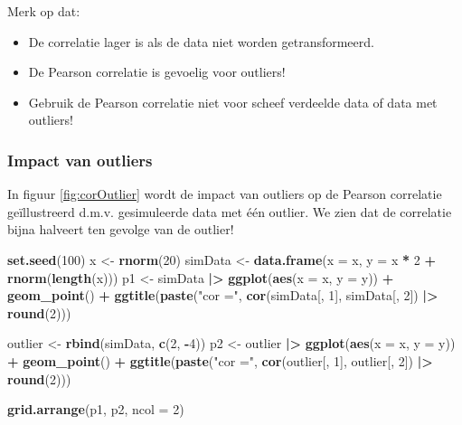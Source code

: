 \documentclass[
  12pt,dutch]{book}
\newenvironment{Shaded}{\begin{snugshade}}{\end{snugshade}}
\newcommand{\AttributeTok}[1]{\textcolor[rgb]{0.13,0.29,0.53}{#1}}
\newcommand{\DecValTok}[1]{\textcolor[rgb]{0.00,0.00,0.81}{#1}}
\newcommand{\FunctionTok}[1]{\textcolor[rgb]{0.13,0.29,0.53}{\textbf{#1}}}
\newcommand{\NormalTok}[1]{#1}
\newcommand{\OtherTok}[1]{\textcolor[rgb]{0.56,0.35,0.01}{#1}}
\newcommand{\SpecialCharTok}[1]{\textcolor[rgb]{0.81,0.36,0.00}{\textbf{#1}}}
\newcommand{\StringTok}[1]{\textcolor[rgb]{0.31,0.60,0.02}{#1}}
\providecommand{\tightlist}{%
  \setlength{\itemsep}{0pt}\setlength{\parskip}{0pt}}
\theoremstyle{definition}
\theoremstyle{definition}
\theoremstyle{definition}
\theoremstyle{definition}
\theoremstyle{remark}
\begin{document}
Merk op dat:

\begin{itemize}
\tightlist
\item
  De correlatie lager is als de data niet worden getransformeerd.
\item
  De Pearson correlatie is gevoelig voor outliers!
\item
  Gebruik de Pearson correlatie niet voor scheef verdeelde data of data met outliers!
\end{itemize}

\subsubsection{Impact van outliers}\label{impact-van-outliers}

In figuur \ref{fig:corOutlier} wordt de impact van outliers op de Pearson correlatie geïllustreerd d.m.v. gesimuleerde data met één outlier. We zien dat de correlatie bijna halveert ten gevolge van de outlier!

\begin{Shaded}
\begin{Highlighting}[]
\FunctionTok{set.seed}\NormalTok{(}\DecValTok{100}\NormalTok{)}
\NormalTok{x }\OtherTok{\textless{}{-}} \FunctionTok{rnorm}\NormalTok{(}\DecValTok{20}\NormalTok{)}
\NormalTok{simData }\OtherTok{\textless{}{-}} \FunctionTok{data.frame}\NormalTok{(}\AttributeTok{x =}\NormalTok{ x, }\AttributeTok{y =}\NormalTok{ x }\SpecialCharTok{*} \DecValTok{2} \SpecialCharTok{+} \FunctionTok{rnorm}\NormalTok{(}\FunctionTok{length}\NormalTok{(x)))}
\NormalTok{p1 }\OtherTok{\textless{}{-}}\NormalTok{ simData }\SpecialCharTok{|\textgreater{}}
    \FunctionTok{ggplot}\NormalTok{(}\FunctionTok{aes}\NormalTok{(}\AttributeTok{x =}\NormalTok{ x, }\AttributeTok{y =}\NormalTok{ y)) }\SpecialCharTok{+} \FunctionTok{geom\_point}\NormalTok{() }\SpecialCharTok{+} \FunctionTok{ggtitle}\NormalTok{(}\FunctionTok{paste}\NormalTok{(}\StringTok{"cor ="}\NormalTok{,}
    \FunctionTok{cor}\NormalTok{(simData[, }\DecValTok{1}\NormalTok{], simData[, }\DecValTok{2}\NormalTok{]) }\SpecialCharTok{|\textgreater{}}
        \FunctionTok{round}\NormalTok{(}\DecValTok{2}\NormalTok{)))}

\NormalTok{outlier }\OtherTok{\textless{}{-}} \FunctionTok{rbind}\NormalTok{(simData, }\FunctionTok{c}\NormalTok{(}\DecValTok{2}\NormalTok{, }\SpecialCharTok{{-}}\DecValTok{4}\NormalTok{))}
\NormalTok{p2 }\OtherTok{\textless{}{-}}\NormalTok{ outlier }\SpecialCharTok{|\textgreater{}}
    \FunctionTok{ggplot}\NormalTok{(}\FunctionTok{aes}\NormalTok{(}\AttributeTok{x =}\NormalTok{ x, }\AttributeTok{y =}\NormalTok{ y)) }\SpecialCharTok{+} \FunctionTok{geom\_point}\NormalTok{() }\SpecialCharTok{+} \FunctionTok{ggtitle}\NormalTok{(}\FunctionTok{paste}\NormalTok{(}\StringTok{"cor ="}\NormalTok{,}
    \FunctionTok{cor}\NormalTok{(outlier[, }\DecValTok{1}\NormalTok{], outlier[, }\DecValTok{2}\NormalTok{]) }\SpecialCharTok{|\textgreater{}}
        \FunctionTok{round}\NormalTok{(}\DecValTok{2}\NormalTok{)))}

\FunctionTok{grid.arrange}\NormalTok{(p1, p2, }\AttributeTok{ncol =} \DecValTok{2}\NormalTok{)}
\end{Highlighting}
\end{Shaded}
\end{document}
